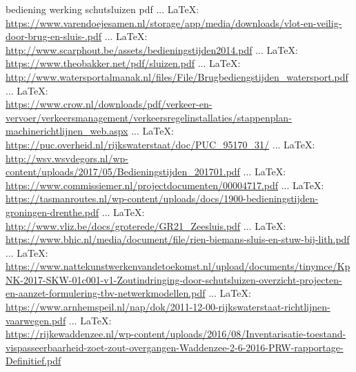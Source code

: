 \begin{thebibliography}{99}
{{{{{{bediening werking schutsluizen pdf
 ... \LaTeX:\\ \url{https://www.varendoejesamen.nl/storage/app/media/downloads/vlot-en-veilig-door-brug-en-sluis-.pdf}
 ... \LaTeX:\\ \url{http://www.scarphout.be/assets/bedieningstijden2014.pdf}
 ... \LaTeX:\\ \url{https://www.theobakker.net/pdf/sluizen.pdf}
 ... \LaTeX:\\ \url{http://www.watersportalmanak.nl/files/File/Brugbediengstijden_watersport.pdf}
 ... \LaTeX:\\ \url{https://www.crow.nl/downloads/pdf/verkeer-en-vervoer/verkeersmanagement/verkeersregelinstallaties/stappenplan-machinerichtlijnen_web.aspx}
 ... \LaTeX:\\ \url{https://puc.overheid.nl/rijkswaterstaat/doc/PUC_95170_31/}
 ... \LaTeX:\\ \url{http://wsv.wsvdegors.nl/wp-content/uploads/2017/05/Bedieningstijden_201701.pdf}
 ... \LaTeX:\\ \url{https://www.commissiemer.nl/projectdocumenten/00004717.pdf}
 ... \LaTeX:\\ \url{https://tasmanroutes.nl/wp-content/uploads/docs/1900-bedieningstijden-groningen-drenthe.pdf}
 ... \LaTeX:\\ \url{http://www.vliz.be/docs/groterede/GR21_Zeesluis.pdf}
 ... \LaTeX:\\ \url{https://www.bhic.nl/media/document/file/rien-biemans-sluis-en-stuw-bij-lith.pdf}
 ... \LaTeX:\\ \url{https://www.nattekunstwerkenvandetoekomst.nl/upload/documents/tinymce/KpNK-2017-SKW-01c001-v1-Zoutindringing-door-schutsluizen-overzicht-projecten-en-aanzet-formulering-tbv-netwerkmodellen.pdf}
 ... \LaTeX:\\ \url{https://www.arnhemspeil.nl/nap/dok/2011-12-00-rijkswaterstaat-richtlijnen-vaarwegen.pdf}
 ... \LaTeX:\\ \url{https://rijkewaddenzee.nl/wp-content/uploads/2016/08/Inventarisatie-toestand-vispasseerbaarheid-zoet-zout-overgangen-Waddenzee-2-6-2016-PRW-rapportage-Definitief.pdf}
}}}}}}
\end{thebibliography}

